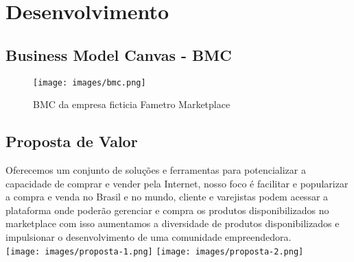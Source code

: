 \documentclass[a4paper]{article}
\begin{document}
\section{Desenvolvimento}
\subsection{Business Model Canvas - BMC}
\begin{figure}[h]
    \centering
    \texttt{[image: images/bmc.png]}
    \caption{BMC da empresa ficticia Fametro Marketplace}
\end{figure}
\subsection{Proposta de Valor}
\par Oferecemos um conjunto de soluções e ferramentas para potencializar a capacidade de comprar e vender pela Internet, nosso foco é facilitar e popularizar a compra e venda no Brasil e no mundo, cliente e varejistas podem acessar a plataforma onde poderão gerenciar e compra os produtos disponibilizados no marketplace com isso aumentamos a diversidade de produtos disponibilizados e impulsionar o desenvolvimento de uma comunidade empreendedora. \\
\texttt{[image: images/proposta-1.png]}
\texttt{[image: images/proposta-2.png]}
\end{document}
